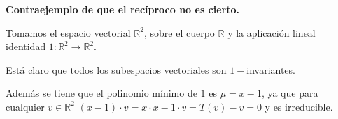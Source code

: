 \documentclass{article}
\newcommand{\R}{\mathbb{R}}
\begin{document}
\textbf{Contraejemplo de que el recíproco no es cierto.}

Tomamos el espacio vectorial $\R^2$, sobre el cuerpo $\R$ y la aplicación lineal identidad $1: \R^2 \longrightarrow \R^2$. 

Está claro que todos los subespacios vectoriales son $1-$invariantes. 

Además se tiene que el polinomio mínimo de $1$ es $\mu = x - 1$, ya que para cualquier $v \in \R^2$ 
$(x-1) \cdot v = x \cdot x - 1 \cdot v = T(v) - v = 0$ y es irreducible.
\end{document}

